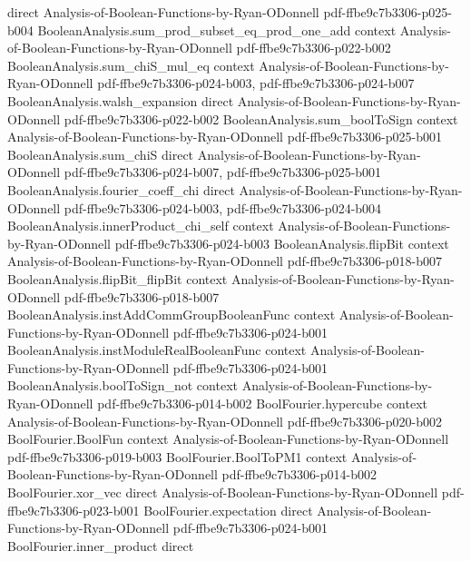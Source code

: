 \begin{lemma}
  {direct}
  {Analysis-of-Boolean-Functions-by-Ryan-ODonnell}
  {pdf-ffbe9c7b3306-p025-b004}
\proofstep
  {BooleanAnalysis.sum_prod_subset_eq_prod_one_add}
  {context}
  {Analysis-of-Boolean-Functions-by-Ryan-ODonnell}
  {pdf-ffbe9c7b3306-p022-b002}
\proofstep
  {BooleanAnalysis.sum_chiS_mul_eq}
  {context}
  {Analysis-of-Boolean-Functions-by-Ryan-ODonnell}
  {pdf-ffbe9c7b3306-p024-b003,
    pdf-ffbe9c7b3306-p024-b007}
\proofstep
  {BooleanAnalysis.walsh_expansion}
  {direct}
  {Analysis-of-Boolean-Functions-by-Ryan-ODonnell}
  {pdf-ffbe9c7b3306-p022-b002}
\proofstep
  {BooleanAnalysis.sum_boolToSign}
  {context}
  {Analysis-of-Boolean-Functions-by-Ryan-ODonnell}
  {pdf-ffbe9c7b3306-p025-b001}
\proofstep
  {BooleanAnalysis.sum_chiS}
  {direct}
  {Analysis-of-Boolean-Functions-by-Ryan-ODonnell}
  {pdf-ffbe9c7b3306-p024-b007,
    pdf-ffbe9c7b3306-p025-b001}
\proofstep
  {BooleanAnalysis.fourier_coeff_chi}
  {direct}
  {Analysis-of-Boolean-Functions-by-Ryan-ODonnell}
  {pdf-ffbe9c7b3306-p024-b003,
    pdf-ffbe9c7b3306-p024-b004}
\proofstep
  {BooleanAnalysis.innerProduct_chi_self}
  {context}
  {Analysis-of-Boolean-Functions-by-Ryan-ODonnell}
  {pdf-ffbe9c7b3306-p024-b003}
\proofstep
  {BooleanAnalysis.flipBit}
  {context}
  {Analysis-of-Boolean-Functions-by-Ryan-ODonnell}
  {pdf-ffbe9c7b3306-p018-b007}
\proofstep
  {BooleanAnalysis.flipBit_flipBit}
  {context}
  {Analysis-of-Boolean-Functions-by-Ryan-ODonnell}
  {pdf-ffbe9c7b3306-p018-b007}
\proofstep
  {BooleanAnalysis.instAddCommGroupBooleanFunc}
  {context}
  {Analysis-of-Boolean-Functions-by-Ryan-ODonnell}
  {pdf-ffbe9c7b3306-p024-b001}
\proofstep
  {BooleanAnalysis.instModuleRealBooleanFunc}
  {context}
  {Analysis-of-Boolean-Functions-by-Ryan-ODonnell}
  {pdf-ffbe9c7b3306-p024-b001}
\proofstep
  {BooleanAnalysis.boolToSign_not}
  {context}
  {Analysis-of-Boolean-Functions-by-Ryan-ODonnell}
  {pdf-ffbe9c7b3306-p014-b002}
\proofstep
  {BoolFourier.hypercube}
  {context}
  {Analysis-of-Boolean-Functions-by-Ryan-ODonnell}
  {pdf-ffbe9c7b3306-p020-b002}
\proofstep
  {BoolFourier.BoolFun}
  {context}
  {Analysis-of-Boolean-Functions-by-Ryan-ODonnell}
  {pdf-ffbe9c7b3306-p019-b003}
\proofstep
  {BoolFourier.BoolToPM1}
  {context}
  {Analysis-of-Boolean-Functions-by-Ryan-ODonnell}
  {pdf-ffbe9c7b3306-p014-b002}
\proofstep
  {BoolFourier.xor_vec}
  {direct}
  {Analysis-of-Boolean-Functions-by-Ryan-ODonnell}
  {pdf-ffbe9c7b3306-p023-b001}
\proofstep
  {BoolFourier.expectation}
  {direct}
  {Analysis-of-Boolean-Functions-by-Ryan-ODonnell}
  {pdf-ffbe9c7b3306-p024-b001}
\proofstep
  {BoolFourier.inner_product}
  {direct}

\end{lemma}
